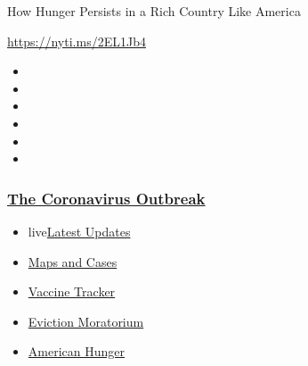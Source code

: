 How Hunger Persists in a Rich Country Like America

\url{https://nyti.ms/2EL1Jb4}

\begin{itemize}
\item
\item
\item
\item
\item
\item
\end{itemize}

\hypertarget{the-coronavirus-outbreak}{%
\subsubsection{\texorpdfstring{\href{https://www.nytimes3xbfgragh.onion/news-event/coronavirus?name=styln-coronavirus-national\&region=TOP_BANNER\&block=storyline_menu_recirc\&action=click\&pgtype=Article\&impression_id=79274710-f1c5-11ea-9d0b-75131b3353e3\&variant=undefined}{The
Coronavirus
Outbreak}}{The Coronavirus Outbreak}}\label{the-coronavirus-outbreak}}

\begin{itemize}
\tightlist
\item
  live\href{https://www.nytimes3xbfgragh.onion/2020/09/08/world/covid-19-coronavirus.html?name=styln-coronavirus-national\&region=TOP_BANNER\&block=storyline_menu_recirc\&action=click\&pgtype=Article\&impression_id=79274711-f1c5-11ea-9d0b-75131b3353e3\&variant=undefined}{Latest
  Updates}
\item
  \href{https://www.nytimes3xbfgragh.onion/interactive/2020/us/coronavirus-us-cases.html?name=styln-coronavirus-national\&region=TOP_BANNER\&block=storyline_menu_recirc\&action=click\&pgtype=Article\&impression_id=79274712-f1c5-11ea-9d0b-75131b3353e3\&variant=undefined}{Maps
  and Cases}
\item
  \href{https://www.nytimes3xbfgragh.onion/interactive/2020/science/coronavirus-vaccine-tracker.html?name=styln-coronavirus-national\&region=TOP_BANNER\&block=storyline_menu_recirc\&action=click\&pgtype=Article\&impression_id=79274713-f1c5-11ea-9d0b-75131b3353e3\&variant=undefined}{Vaccine
  Tracker}
\item
  \href{https://www.nytimes3xbfgragh.onion/2020/09/02/your-money/eviction-moratorium-covid.html?name=styln-coronavirus-national\&region=TOP_BANNER\&block=storyline_menu_recirc\&action=click\&pgtype=Article\&impression_id=79274714-f1c5-11ea-9d0b-75131b3353e3\&variant=undefined}{Eviction
  Moratorium}
\item
  \href{https://www.nytimes3xbfgragh.onion/interactive/2020/09/02/magazine/food-insecurity-hunger-us.html?name=styln-coronavirus-national\&region=TOP_BANNER\&block=storyline_menu_recirc\&action=click\&pgtype=Article\&impression_id=79274715-f1c5-11ea-9d0b-75131b3353e3\&variant=undefined}{American
  Hunger}
\end{itemize}

